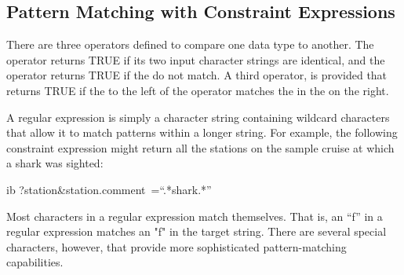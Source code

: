 \subsection{Pattern Matching with Constraint Expressions}
\label{opd-client,CE,regex}

There are three operators defined to compare one  data
type to another. The \lit{=} operator returns TRUE if its two input
character strings are identical, and the \lit{!=} operator returns
TRUE if the  do not match. A third operator,
\math[\~{}=]{\sim =} is provided that returns TRUE if the 
to the left of the operator matches the  in
the  on the right.

 
 A regular expression is simply a
character string containing wildcard characters that allow it to match
patterns within a longer string. For example, the following constraint
expression might return all the stations on the sample cruise at which
a shark was sighted:

\begin{vcode}{ib}
?station&station.comment~=``.*shark.*''
\end{vcode}

  Most characters in a
regular expression match themselves. That is, an ``f'' in a regular
expression matches an "f" in the target string. There are several
special characters, however, that provide more sophisticated
pattern-matching capabilities.  

